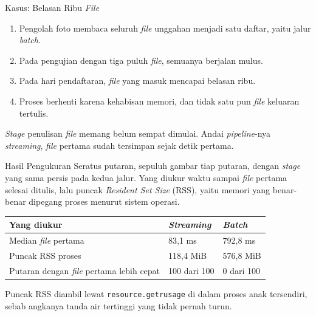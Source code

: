 \documentclass[aspectratio=169, table, 12pt]{beamer}
\begin{document}
\begin{frame}{{\Large Kasus: Belasan Ribu \textit{File}}}
  \vspace{8pt}
  \begin{enumerate}\small
    \item Pengolah foto membaca seluruh \textit{file} unggahan menjadi satu
          daftar, yaitu jalur \textit{batch}.
    \item Pada pengujian dengan tiga puluh \textit{file}, semuanya berjalan
          mulus.
    \item Pada hari pendaftaran, \textit{file} yang masuk mencapai belasan ribu.
    \item Proses berhenti karena kehabisan memori, dan tidak satu pun
          \textit{file} keluaran tertulis.
  \end{enumerate}

  \vspace{8pt}
  {\small \textit{Stage} penulisan \textit{file} memang belum sempat dimulai. Andai
  \textit{pipeline}-nya \textit{streaming}, \textit{file} pertama sudah tersimpan
  sejak detik pertama.}
\end{frame}

\begin{frame}{{\Large Hasil Pengukuran}}
  \vspace{6pt}
  {\small Seratus putaran, sepuluh gambar tiap putaran, dengan \textit{stage}
  yang sama persis pada kedua jalur. Yang diukur waktu sampai \textit{file}
  pertama selesai ditulis, lalu puncak \textit{Resident Set Size} (RSS), yaitu
  memori yang benar-benar dipegang proses menurut sistem operasi.}

  \vspace{8pt}
  \centering
  \small
  \begin{tabularx}{0.9\textwidth}{|X|l|l|}
    \hline
    \textbf{Yang diukur} & \textbf{\textit{Streaming}} & \textbf{\textit{Batch}} \\
    \hline
    Median \textit{file} pertama & 83,1 ms & 792,8 ms \\
    \hline
    Puncak RSS proses & 118,4 MiB & 576,8 MiB \\
    \hline
    Putaran dengan \textit{file} pertama lebih cepat & 100 dari 100 & 0 dari 100 \\
    \hline
  \end{tabularx}

  \vspace{8pt}
  {\small Puncak RSS diambil lewat \texttt{resource.getrusage} di dalam proses
  anak tersendiri, sebab angkanya tanda air tertinggi yang tidak pernah turun.}
\end{frame}
\end{document}
